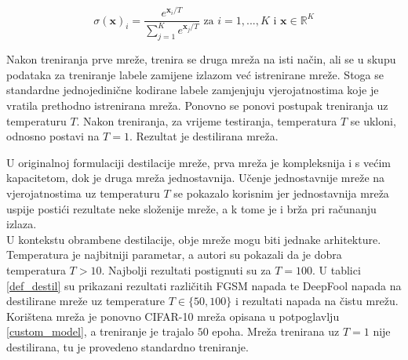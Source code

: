 \documentclass[utf8, diplomski]{fer}
\begin{document}
\begin{equation}\label{softmax_t}
	\sigma(\boldsymbol{x})_{i} = \frac{e^{\boldsymbol{x}_{i} / T}}{\sum_{j=1}^{K}e^{\boldsymbol{x}_{j} / T}} \text{ za } i = 1, ..., K \text{ i } \boldsymbol{x} \in \mathbb{R}^{K}
\end{equation}

Nakon treniranja prve mreže, trenira se druga mreža na isti način, ali se u skupu podataka za treniranje labele zamijene izlazom već istrenirane mreže. Stoga se standardne jednojedinične kodirane labele zamjenjuju vjerojatnostima koje je vratila prethodno istrenirana mreža. Ponovno se ponovi postupak treniranja uz temperaturu $T$. Nakon treniranja, za vrijeme testiranja, temperatura $T$ se ukloni, odnosno postavi na $T = 1$. Rezultat je destilirana mreža. \par
U originalnoj formulaciji destilacije mreže, prva mreža je kompleksnija i s većim kapacitetom, dok je druga mreža jednostavnija. Učenje jednostavnije mreže na vjerojatnostima uz temperaturu $T$ se pokazalo korisnim jer jednostavnija mreža uspije postići rezultate neke složenije mreže, a k tome je i brža pri računanju izlaza. \\
U kontekstu obrambene destilacije, obje mreže mogu biti jednake arhitekture. Temperatura je najbitniji parametar, a autori su pokazali da je dobra temperatura $T > 10$. Najbolji rezultati postignuti su za $T = 100$. U tablici \ref{def_destil} su prikazani rezultati različitih FGSM napada te DeepFool napada na destilirane mreže uz temperature $T \in \{50, 100\}$ i rezultati napada na čistu mrežu. Korištena mreža je ponovno CIFAR-10 mreža opisana u potpoglavlju \ref{custom_model}, a treniranje je trajalo $50$ epoha. Mreža trenirana uz $T = 1$ nije destilirana, tu je provedeno standardno treniranje.
\end{document}
